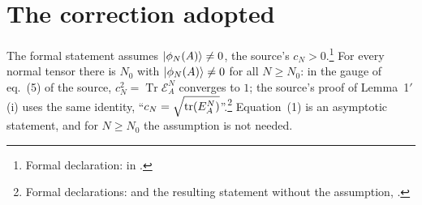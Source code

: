 \documentclass{article}
\begin{document}
\section{The correction adopted}
The formal statement assumes $|\phi_N(A)\rangle\neq0$, the source's $c_N>0$.\footnote{Formal
    declaration:
    in .}
For every normal tensor there is $N_0$ with $|\phi_N(A)\rangle\neq0$ for all
$N\ge N_0$: in the gauge of eq.~(5) of the source,
$c_N^2=\operatorname{Tr}\mathcal E_A^N$ converges to $1$; the source's proof of
Lemma~1$'$(i) uses the same identity, ``$c_N = \sqrt{\operatorname{tr} (E_A^N)}$''.\footnote{Formal declarations:
     and the resulting
    statement without the assumption,
    .}
Equation~(1) is an asymptotic statement, and for $N\ge N_0$ the assumption is
not needed.



\end{document}
